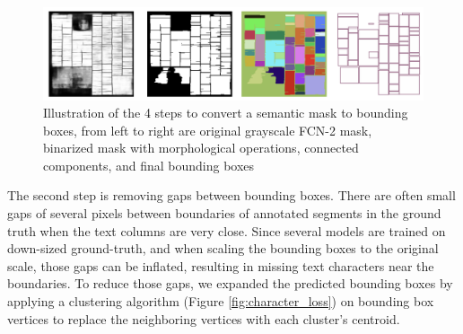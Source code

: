 \documentclass[letterpaper]{article} %
\begin{document}

 \begin{figure}[t]
   \centering
   \includegraphics[width=\linewidth]{LaTeX/Figures/mask_to_bbox.png}
   \caption{Illustration of the 4 steps to convert a semantic mask to bounding boxes, from left to right are original grayscale FCN-2 mask, binarized mask with morphological operations, connected components, and final bounding boxes}
   \label{fig:mask2bbox}
 \end{figure}
 
The second step is removing gaps between bounding boxes.
There are often small gaps of several pixels between boundaries of annotated segments in the ground truth when the text columns are very close. Since several models are trained on down-sized ground-truth, and when scaling the bounding boxes to the original scale, those gaps can be inflated, resulting in missing text characters near the boundaries. 
To reduce those gaps, we expanded the predicted bounding boxes by applying a clustering algorithm (Figure \ref{fig:character_loss}) on bounding box vertices to replace the neighboring vertices with each cluster's centroid.

\end{document}
